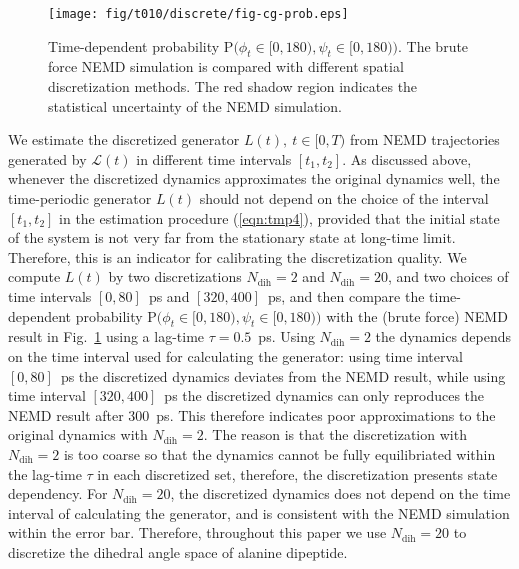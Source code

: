 \documentclass[aps, pre, preprint,unsortedaddress,a4paper,onecolumn]{revtex4}
\newcommand{\recheck}[1]{{\color{red} #1}}
\newcommand{\ml}[0]{\mathcal {L}}
\newcommand{\prob}{\textrm{P}}
\newcommand{\dih}{\textrm{dih}}
\begin{document}
%



\begin{figure}
  \centering
  \texttt{[image: fig/t010/discrete/fig-cg-prob.eps]}  
  \caption{Time-dependent probability $\prob\big(\phi_t\in[0,180), \psi_t\in [0,180)\big)$.  The brute force NEMD simulation is compared with different
    spatial discretization methods. The red shadow region indicates the
    statistical uncertainty of the NEMD simulation.}
  \label{fig:tmp2}
\end{figure}

We estimate the discretized generator $L(t), \ t\in[0,T)$
from NEMD trajectories generated by $\ml(t)$ in different time intervals $[t_1,
t_2]$.
As discussed above, whenever  the discretized dynamics approximates the original
dynamics well, the time-periodic generator $L(t)$ should not depend on the choice of the interval $[t_1,t_2]$ in the estimation procedure (\ref{eqn:tmp4}), provided that the initial state of the system
is not very far from the stationary state at long-time limit.
Therefore, this is an indicator for calibrating the discretization quality.
We compute $L(t)$ by two discretizations $N_\dih=2$ and $N_\dih=20$, and two
choices of time intervals $[0, 80]$~ps and $[320, 400]$~ps, and then
compare the time-dependent probability $\prob\big(\phi_t\in[0,180), \psi_t\in [0,180)\big)$
with the (brute force) NEMD result in Fig.~\ref{fig:tmp2} using a lag-time $\tau=0.5$~ps.
Using $N_\dih=2$ the dynamics depends on the time interval used for
calculating the generator: using time interval $[0, 80]$~ps the discretized
dynamics deviates from the NEMD result,
while using time interval $[320, 400]$~ps the discretized dynamics can only
reproduces the NEMD result after 300~ps.  This therefore indicates poor 
approximations to the original dynamics with $N_\dih=2$. The reason is that the
discretization with $N_\dih=2$ is too coarse so that the dynamics cannot be fully
equilibriated within the lag-time $\tau$ in each discretized set,
therefore, the discretization presents state dependency.  For
$N_\dih=20$, the discretized dynamics does not depend on the time interval of
calculating the generator, and is consistent with the
NEMD simulation within the error bar. Therefore, throughout this paper we use $N_\dih=20$
to discretize  the dihedral angle space of alanine dipeptide.
\end{document}
